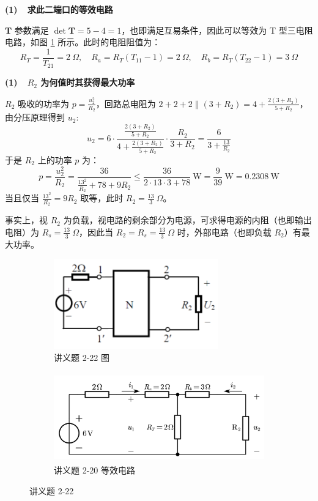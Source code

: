 \documentclass[UTF8]{report}
\theoremstyle{MyLineTheoremStyle} %
\theoremstyle{MyBlockTheoremStyle} %
\theoremstyle{MySubsubsectionStyle} %
\begin{document}
\noindent \textbf{(1)\ \ 求此二端口的等效电路}

$\boldsymbol{T}$ 参数满足 $\det \boldsymbol{T} = 5 - 4 = 1$，也即满足互易条件，因此可以等效为 T 型三电阻电路，如图 \ref{讲义题 2-22} 所示。此时的电阻阻值为：
\begin{equation}
R_T = \frac{1}{T_{21}} = 2 \ \Omega,\quad R_a = R_T(T_{11} - 1) = 2\ \Omega,\quad R_b = R_T(T_{22} - 1) = 3\ \Omega
\end{equation}

\noindent \textbf{(1)\ \ $R_2$ 为何值时其获得最大功率}

$R_2$ 吸收的功率为 $p = \frac{u_2^2}{R_2}$，回路总电阻为 $2 + 2 + 2 \parallel (3 + R_2) = 4 + \frac{2(3+R_2)}{5+R_2}$，由分压原理得到 $u_2$:
\begin{equation}
u_2 = 6\cdot \frac{\frac{2(3+R_2)}{5+R_2}}{4 + \frac{2(3+R_2)}{5+R_2}} \cdot \frac{R_2}{ 3 + R_2} = \frac{6}{3+\frac{13}{R_2}}
\end{equation}
于是 $R_2$ 上的功率 $p$ 为：
\begin{equation}
p = \frac{u_2^2}{R_2} = \frac{36}{\frac{13^2}{R_2} + 78 + 9R_2} \leqslant \frac{36}{2\cdot 13 \cdot 3 + 78} \ \mathrm{W} = \frac{9}{39}\ \mathrm{W} = 0.2308 \ \mathrm{W}
\end{equation}
当且仅当 $\frac{13^2}{R_2} = 9R_2$ 取等，此时 $R_2 = \frac{13}{3}\ \Omega$。

事实上，视 $R_2$ 为负载，视电路的剩余部分为电源，可求得电源的内阻（也即输出电阻）为 $R_s = \frac{13}{3}\ \Omega$，因此当 $R_2 = R_s =  \frac{13}{3}\ \Omega$ 时，外部电路（也即负载 $R_2$）有最大功率。 

\begin{figure}[H]\centering
\begin{subfigure}[t]{0.4\columnwidth}\centering
    \includegraphics[height=110pt]{assets/4/199279d29390a5449f7ef5c5dc7f8a3d.png}
    \caption{ 讲义题 2-22 图 }
\end{subfigure}\begin{subfigure}[t]{0.6\columnwidth}\centering
    \includegraphics[height=110pt]{assets/4/2-22.pdf}
    \caption{ 讲义题 2-20 等效电路 }
\end{subfigure}
\caption{ 讲义题 2-22 }
\label{讲义题 2-22}
\end{figure}
\end{document}
